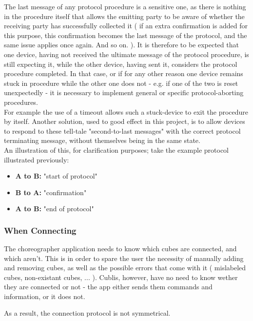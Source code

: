 The last message of any protocol procedure is a sensitive one, as there is nothing in the procedure itself that allows the emitting party to be aware of whether the receiving party has successfully collected it ( if an extra confirmation is added for this purpose, this confirmation becomes the last message of the protocol, and the same issue applies once again. And so on. ). 
It is therefore to be expected that one device, having not received the ultimate message of the protocol procedure, is still expecting it, while the other device, having sent it, considers the protocol procedure completed.
In that case, or if for any other reason one device remains stuck in procedure while the other one does not - e.g. if one of the two is reset unexpectedly - it is necessary to implement general or specific protocol-aborting procedures.\\

For example the use of a timeout allows such a stuck-device to exit the procedure by itself.
Another solution, used to good effect in this project, is to allow devices to respond to these tell-tale "second-to-last messages" with the correct protocol terminating message, without themselves being in the same state.\\

An illustration of this, for clarification purposes; take the example protocol illustrated previously:

\begin{itemize}
\item[] \textbf{A to B:} "start of protocol"
\item[] \textbf{B to A:} "confirmation"
\item[] \textbf{A to B:} "end of protocol"
\end{itemize}

\subsubsection{When Connecting}

The choreographer application needs to know which cubes are connected, and which aren't. This is in order to spare the user the necessity of manually adding and removing cubes, as well as the possible errors that come with it ( mislabeled cubes, non-existant cubes, ... ). Cublis, however, have no need to know wether they are connected or not - the app either sends them commands and information, or it does not.

As a result, the connection protocol is not symmetrical. 

